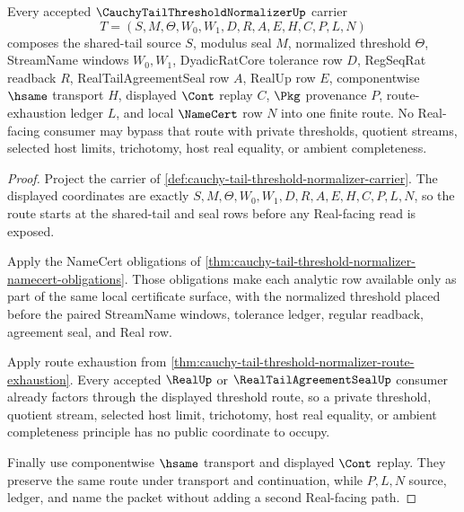 \begin{theorem}
\label{thm:cauchy-tail-threshold-composition-scope}
Every accepted $\CauchyTailThresholdNormalizerUp$ carrier
$$
T=(S,M,\Theta,W_0,W_1,D,R,A,E,H,C,P,L,N)
$$
composes the shared-tail source $S$, modulus seal $M$, normalized threshold $\Theta$, StreamName windows $W_0,W_1$, DyadicRatCore tolerance row $D$, RegSeqRat readback $R$, RealTailAgreementSeal row $A$, RealUp row $E$, componentwise $\hsame$ transport $H$, displayed $\Cont$ replay $C$, $\Pkg$ provenance $P$, route-exhaustion ledger $L$, and local $\NameCert$ row $N$ into one finite route. No Real-facing consumer may bypass that route with private thresholds, quotient streams, selected host limits, trichotomy, host real equality, or ambient completeness.
\end{theorem}
\begin{proof}
Project the carrier of \autoref{def:cauchy-tail-threshold-normalizer-carrier}. The displayed coordinates are exactly $S,M,\Theta,W_0,W_1,D,R,A,E,H,C,P,L,N$, so the route starts at the shared-tail and seal rows before any Real-facing read is exposed.

Apply the NameCert obligations of \autoref{thm:cauchy-tail-threshold-normalizer-namecert-obligations}. Those obligations make each analytic row available only as part of the same local certificate surface, with the normalized threshold placed before the paired StreamName windows, tolerance ledger, regular readback, agreement seal, and Real row.

Apply route exhaustion from \autoref{thm:cauchy-tail-threshold-normalizer-route-exhaustion}. Every accepted $\RealUp$ or $\RealTailAgreementSealUp$ consumer already factors through the displayed threshold route, so a private threshold, quotient stream, selected host limit, trichotomy, host real equality, or ambient completeness principle has no public coordinate to occupy.

Finally use componentwise $\hsame$ transport and displayed $\Cont$ replay. They preserve the same route under transport and continuation, while $P,L,N$ source, ledger, and name the packet without adding a second Real-facing path.
\end{proof}

